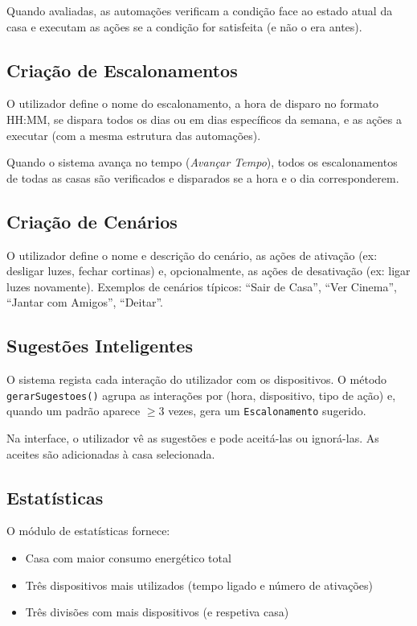 \documentclass[a4paper]{article}
\begin{document}
Quando avaliadas, as automações verificam a condição face ao estado atual da casa e executam as ações se a condição for satisfeita (e não o era antes).

\subsection{Criação de Escalonamentos}

O utilizador define o nome do escalonamento, a hora de disparo no formato HH:MM, se dispara todos os dias ou em dias específicos da semana, e as ações a executar (com a mesma estrutura das automações).

Quando o sistema avança no tempo (\textit{Avançar Tempo}), todos os escalonamentos de todas as casas são verificados e disparados se a hora e o dia corresponderem.

\subsection{Criação de Cenários}

O utilizador define o nome e descrição do cenário, as ações de ativação (ex: desligar luzes, fechar cortinas) e, opcionalmente, as ações de desativação (ex: ligar luzes novamente). Exemplos de cenários típicos: ``Sair de Casa'', ``Ver Cinema'', ``Jantar com Amigos'', ``Deitar''.

\subsection{Sugestões Inteligentes}

O sistema regista cada interação do utilizador com os dispositivos. O método \texttt{gerarSugestoes()} agrupa as interações por (hora, dispositivo, tipo de ação) e, quando um padrão aparece $\geq 3$ vezes, gera um \texttt{Escalonamento} sugerido.

Na interface, o utilizador vê as sugestões e pode aceitá-las ou ignorá-las. As aceites são adicionadas à casa selecionada.

\subsection{Estatísticas}

O módulo de estatísticas fornece:

\begin{itemize}
    \item Casa com maior consumo energético total
    \item Três dispositivos mais utilizados (tempo ligado e número de ativações)
    \item Três divisões com mais dispositivos (e respetiva casa)
\end{itemize}
\end{document}
